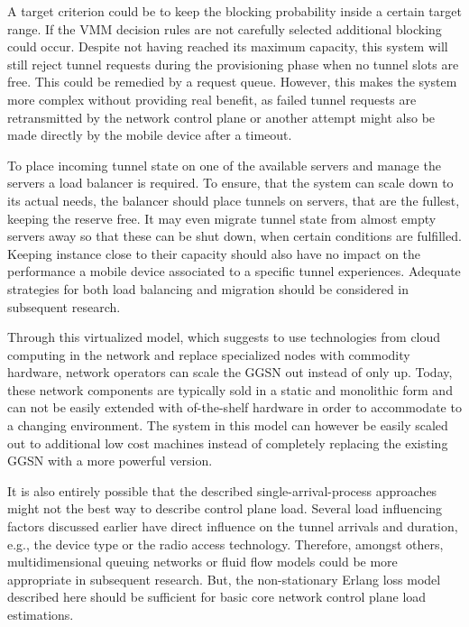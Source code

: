 A target criterion could be to keep the blocking probability inside a certain target range. If the \gls{VMM} decision rules are not carefully selected additional blocking could occur. Despite not having reached its maximum capacity, this system will still reject tunnel requests during the provisioning phase when no tunnel slots are free. This could be remedied by a request queue. However, this makes the system more complex without providing real benefit, as failed tunnel requests are retransmitted by the network control plane or another attempt might also be made directly by the mobile device after a timeout.

To place incoming tunnel state on one of the available servers and manage the servers a load balancer is required. To ensure, that the system can scale down to its actual needs, the balancer should place tunnels on servers, that are the fullest, keeping the reserve free. It may even migrate tunnel state from almost empty servers away so that these can be shut down, when certain conditions are fulfilled. Keeping instance close to their capacity should also have no impact on the performance a mobile device associated to a specific tunnel experiences. Adequate strategies for both load balancing and migration should be considered in subsequent research.

Through this virtualized model, which suggests to use technologies from cloud computing in the network and replace specialized nodes with commodity hardware, network operators can scale the \gls{GGSN} out instead of only up. Today, these network components are typically sold in a static and monolithic form and can not be easily extended with of-the-shelf hardware in order to accommodate to a changing environment. The system in this model can however be easily scaled out to additional low cost machines instead of completely replacing the existing \gls{GGSN} with a more powerful version. 

It is also entirely possible that the described single-arrival-process approaches might not the best way to describe control plane load. Several load influencing factors discussed earlier have direct influence on the tunnel arrivals and duration, e.g., the device type or the radio access technology. Therefore, amongst others, multidimensional queuing networks or fluid flow models could be more appropriate in subsequent research. But, the non-stationary Erlang loss model described here should be sufficient for basic core network control plane load estimations.


